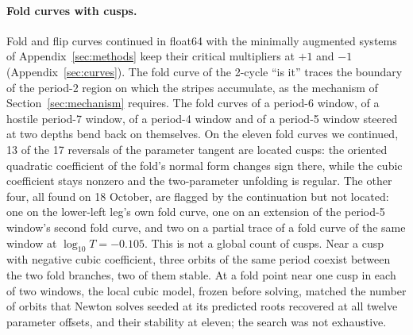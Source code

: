 \documentclass[11pt,letterpaper]{article}
\begin{document}
\paragraph{Fold curves with cusps.} Fold and flip curves continued in float64 with the minimally augmented systems of
Appendix~\ref{sec:methods} keep their critical multipliers at $+1$ and $-1$ (Appendix~\ref{sec:curves}). The fold
curve of the 2-cycle ``is it'' traces the boundary of the period-2 region on which the stripes accumulate, as the
mechanism of Section~\ref{sec:mechanism} requires. The fold curves of a period-6
window, of a hostile period-7 window, of a period-4 window and of a period-5 window steered at two depths bend back
on themselves. On the eleven fold curves we continued, 13 of the 17 reversals of the parameter tangent are located
cusps: the oriented quadratic coefficient of the fold's normal form changes sign there,
while the cubic coefficient stays nonzero and the two-parameter unfolding is regular. The other four, all found on 18
October, are flagged by the continuation but not located: one on the lower-left leg's own fold curve, one on an
extension of the period-5 window's second fold curve, and two on a partial trace of a fold curve of the same window
at $\log_{10}T=-0.105$. This is not a global count of cusps. Near a cusp with negative cubic coefficient, three orbits of the same period coexist between the two fold
branches, two of them stable. At a fold point near one cusp in each of two windows, the local cubic model, frozen
before solving, matched the number of orbits that Newton solves seeded at its predicted roots recovered at all twelve
parameter offsets, and their stability at eleven; the search was not exhaustive.
\end{document}
